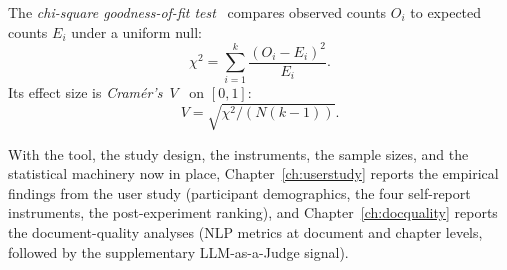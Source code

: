 The \emph{chi-square goodness-of-fit test}~\cite{Pearson1900} compares observed counts $O_i$ to expected counts $E_i$ under a uniform null:
\begin{equation}
\chi^2 = \sum_{i=1}^{k} \frac{(O_i - E_i)^2}{E_i}.
\end{equation}
Its effect size is \emph{Cram\'{e}r's~$V$}~\cite{Cramer1946} on $[0, 1]$:
\begin{equation}
V = \sqrt{\chi^2 / (N (k - 1))}.
\end{equation}

\bigskip

With the tool, the study design, the instruments, the sample
sizes, and the statistical machinery now in place,
Chapter~\ref{ch:userstudy} reports the empirical findings from
the user study (participant demographics, the four self-report
instruments, the post-experiment ranking), and
Chapter~\ref{ch:docquality} reports the document-quality analyses
(NLP metrics at document and chapter levels, followed by the
supplementary LLM-as-a-Judge signal).
